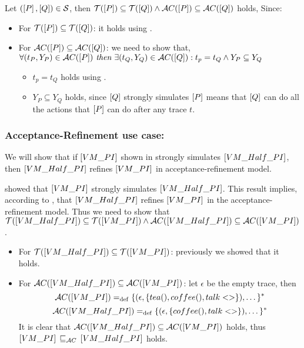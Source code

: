 \begin{prf}
Let $(\left[P\right],\left[Q\right])\in{}\mathcal{S}$, then $\traces[P]\subseteq\traces[Q] \wedge \accepatances[P]\subseteq\accepatances[Q]$ holds, Since:
\begin{itemize}
\item For $\traces[P]\subseteq\traces[Q]$: it holds using .
\item For $\accepatances[P]\subseteq\accepatances[Q]$: we need to show that,\\$\forall (t_P, Y_P) \in \accepatances[P] \textit{ then } \exists (t_Q, Y_Q) \in \accepatances[Q]: t_p = t_Q \wedge Y_P \subseteq Y_Q$
\begin{itemize}
\item $t_p = t_Q$ holds using .
\item $Y_P \subseteq Y_Q$ holds, since $\left[Q\right]$ strongly simulates $\left[P\right]$ means that $\left[Q\right]$ can do all the actions that $\left[P\right]$ can do after any trace $t$.
\end{itemize}
\end{itemize}
\end{prf}
\subsubsection{Acceptance-Refinement use case:}
 We will show that if $\left[VM\_PI\right]$ shown in  strongly simulates $\left[VM\_Half\_PI\right]$, then $\left[VM\_Half\_PI\right]$ refines $\left[VM\_PI\right]$ in acceptance-refinement model.
 
  showed that $\left[VM\_PI\right]$ strongly simulates $\left[VM\_Half\_PI\right]$. This result implies, according to , that $\left[VM\_Half\_PI\right]$ refines $\left[VM\_PI\right]$ in the acceptance-refinement model. Thus we need to show that $\traces[VM\_Half\_PI]\subseteq\traces[VM\_PI] \wedge \accepatances[VM\_Half\_PI]\subseteq\accepatances[VM\_PI]$.
 
 \begin{itemize}
\item For $\traces[VM\_Half\_PI]\subseteq\traces[VM\_PI]$: previously we showed that it holds. 

\item For $\accepatances[VM\_Half\_PI]\subseteq\accepatances[VM\_PI]$: let $\epsilon$ be the empty trace, then
    \[\accepatances[VM\_PI] \define \{(\epsilon,\{tea(),coffee(),talk<>\}),\dots\}^\ast\]
    \[\accepatances[VM\_Half\_PI] \define \{(\epsilon,\{coffee(),talk<>\}),\dots\}^\ast\]
It is clear that $\accepatances[VM\_Half\_PI]\subseteq\accepatances[VM\_PI]$ holds, thus $\ec{VM\_PI} \refiAC \ec{VM\_Half\_PI}$ holds.
\end{itemize}